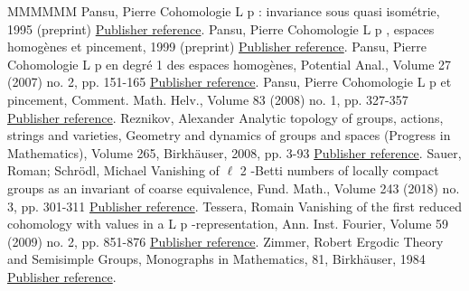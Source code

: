 \documentclass[11pt]{article}
\theoremstyle{definition}
\numberwithin{equation}{section}
\numberwithin{figure}{section}
\numberwithin{table}{section}
\begin{document}
\begin{thebibliography}{MMMMMM}
 Pansu, Pierre Cohomologie L p  : invariance sous quasi isométrie, 1995 (preprint) \href{https://ahl.centre-mersenne.org/item/AHL_2020__3__1291_0/#Pa95}{Publisher reference}.
 Pansu, Pierre Cohomologie L p , espaces homogènes et pincement, 1999 (preprint) \href{https://ahl.centre-mersenne.org/item/AHL_2020__3__1291_0/#Pa99}{Publisher reference}.
 Pansu, Pierre Cohomologie L p  en degré 1 des espaces homogènes, Potential Anal., Volume 27 (2007) no. 2, pp. 151-165 \href{https://ahl.centre-mersenne.org/item/AHL_2020__3__1291_0/#P2}{Publisher reference}.
 Pansu, Pierre Cohomologie L p  et pincement, Comment. Math. Helv., Volume 83 (2008) no. 1, pp. 327-357 \href{https://ahl.centre-mersenne.org/item/AHL_2020__3__1291_0/#P1}{Publisher reference}.
 Reznikov, Alexander Analytic topology of groups, actions, strings and varieties, Geometry and dynamics of groups and spaces (Progress in Mathematics), Volume 265, Birkhäuser, 2008, pp. 3-93 \href{https://ahl.centre-mersenne.org/item/AHL_2020__3__1291_0/#Rez}{Publisher reference}.
 Sauer, Roman; Schrödl, Michael Vanishing of \(\ell\) 2 -Betti numbers of locally compact groups as an invariant of coarse equivalence, Fund. Math., Volume 243 (2018) no. 3, pp. 301-311 \href{https://ahl.centre-mersenne.org/item/AHL_2020__3__1291_0/#SaSc}{Publisher reference}.
 Tessera, Romain Vanishing of the first reduced cohomology with values in a L p -representation, Ann. Inst. Fourier, Volume 59 (2009) no. 2, pp. 851-876 \href{https://ahl.centre-mersenne.org/item/AHL_2020__3__1291_0/#T}{Publisher reference}.
 Zimmer, Robert Ergodic Theory and Semisimple Groups, Monographs in Mathematics, 81, Birkhäuser, 1984 \href{https://ahl.centre-mersenne.org/item/AHL_2020__3__1291_0/#Z}{Publisher reference}.
\end{thebibliography}
\end{document}

